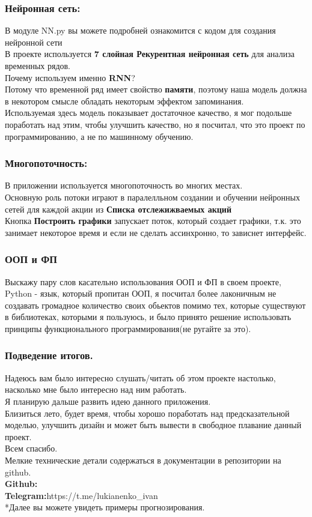 \documentclass{beamer}
\begin{document}
\begin{frame}
 \frametitle{Нейронная сеть:}
 В модуле NN.py вы можете подробней ознакомится с кодом для создания нейронной сети\\
 В проекте используется \textbf{7 слойная Рекурентная нейронная сеть} для анализа временных рядов.\\
 Почему используем именно \textbf{RNN}?\\
 Потому что временной ряд имеет свойство \textbf{памяти}, поэтому наша модель должна в некотором смысле обладать некоторым эффектом запоминания.\\
 Используемая здесь модель показывает достаточное качество, я мог подольше поработать над этим, чтобы улучшить качество, но я посчитал, что это проект по программированию, а не по машинному обучению.
\end{frame}

\begin{frame}
 \frametitle{Многопоточность:}
 В приложении используется многопоточность во многих местах.\\
 Основную роль потоки играют в паралелльном создании и обучении нейронных сетей для каждой акции из \textbf{Списка отслежижваемых акций}\\
 Кнопка \textbf{Построить графики} запускает поток, который создает графики, т.к. это занимает некоторое время и если не сделать ассинхронно, то зависнет интерфейс.
\end{frame}

\begin{frame}
 \frametitle{ООП и ФП}
 Выскажу пару слов касательно использования ООП и ФП в своем проекте, Python - язык, который пропитан ООП, я посчитал более лаконичным не создавать громадное количество своих обьектов помимо тех, которые существуют в библиотеках, которыми я пользуюсь, и было принято решение использовать принципы функционального программирования(не ругайте за это).
\end{frame}
\begin{frame}
 \frametitle{Подведение итогов.}
 Надеюсь вам было интересно слушать/читать об этом проекте настолько, насколько мне было интересно над ним работать.\\
 Я планирую дальше развить идею данного приложения.\\
 Близиться лето, будет время, чтобы хорошо поработать над предсказательной моделью, улучшить дизайн и может быть вывести в свободное плавание данный проект.\\
 Всем спасибо.\\
 Мелкие технические детали содержаться в документации в репозитории на github.\\
 \textbf{Github:} \\
 \textbf{Telegram:}https://t.me/lukianenko\_ivan\\
 *Далее вы можете увидеть примеры прогнозирования.
\end{frame}
\end{document}
